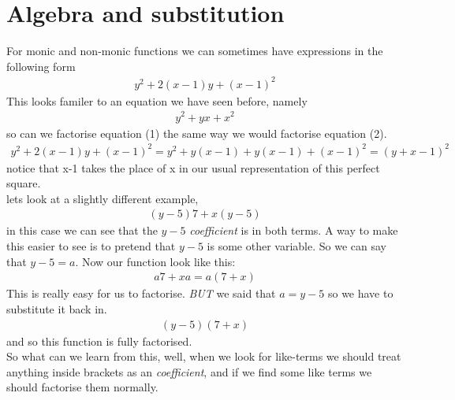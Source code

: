 \documentclass{article}
\date\today
\begin{document}

\section*{Algebra and substitution}
For monic and non-monic functions we can sometimes have expressions in the following form
\begin{align}
    y^2 + 2(x-1)y + (x-1)^2
\end{align}
This looks familer to an equation we have seen before, namely
\begin{align}
    y^2 + yx + x^2
\end{align}
so can we factorise equation (1) the same way we would factorise equation (2).
\begin{align*}
    y^2 + 2(x-1)y + (x-1)^2 = y^2 + y(x-1) + y(x-1) + (x-1)^2  = (y + x - 1)^2
\end{align*}
notice that x-1 takes the place of x in our usual representation of this perfect square.
\\[2mm]
lets look at a slightly different example, 
\begin{align}
    (y-5)7 + x(y-5) 
\end{align}
in this case we can see that the $y-5$ \emph{\gls{coefficient}} is in both terms. A way to make this easier to see is to pretend that $y-5$ is some other variable. So we can say that $y-5 = a$. Now our function look like this:
\begin{align*}
    a7 + xa = a(7+x)
\end{align*}
This is really easy for us to factorise. \emph{BUT} we said that $a = y-5$ so we have to substitute it back in.
\begin{align*}
    (y-5)(7+x)
\end{align*}
and so this function is fully factorised.\\[2mm]
So what can we learn from this, well, when we look for like-terms we should treat anything inside brackets as an \emph{coefficient}, and if we find some like terms we should factorise them normally.
\end{document}

